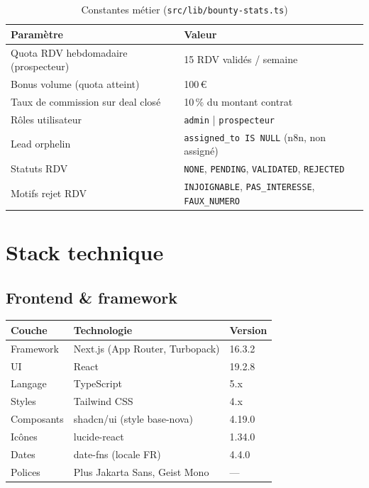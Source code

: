 \documentclass[11pt,a4paper]{report}
\begin{document}
\begin{table}[h]
\centering
\begin{tabular}{@{}ll@{}}
\toprule
\textbf{Paramètre} & \textbf{Valeur} \\
\midrule
Quota RDV hebdomadaire (prospecteur) & 15 RDV validés / semaine \\
Bonus volume (quota atteint) & 100\,€ \\
Taux de commission sur deal closé & 10\,\% du montant contrat \\
Rôles utilisateur & \texttt{admin} | \texttt{prospecteur} \\
Lead orphelin & \texttt{assigned\_to IS NULL} (n8n, non assigné) \\
Statuts RDV & \texttt{NONE}, \texttt{PENDING}, \texttt{VALIDATED}, \texttt{REJECTED} \\
Motifs rejet RDV & \texttt{INJOIGNABLE}, \texttt{PAS\_INTERESSE}, \texttt{FAUX\_NUMERO} \\
\bottomrule
\end{tabular}
\caption{Constantes métier (\texttt{src/lib/bounty-stats.ts})}
\end{table}

\chapter{Stack technique}

\section{Frontend \& framework}

\begin{table}[h]
\centering
\begin{tabular}{@{}lll@{}}
\toprule
\textbf{Couche} & \textbf{Technologie} & \textbf{Version} \\
\midrule
Framework & Next.js (App Router, Turbopack) & 16.3.2 \\
UI & React & 19.2.8 \\
Langage & TypeScript & 5.x \\
Styles & Tailwind CSS & 4.x \\
Composants & shadcn/ui (style base-nova) & 4.19.0 \\
Icônes & lucide-react & 1.34.0 \\
Dates & date-fns (locale FR) & 4.4.0 \\
Polices & Plus Jakarta Sans, Geist Mono & --- \\
\bottomrule
\end{tabular}
\end{table}
\end{document}
